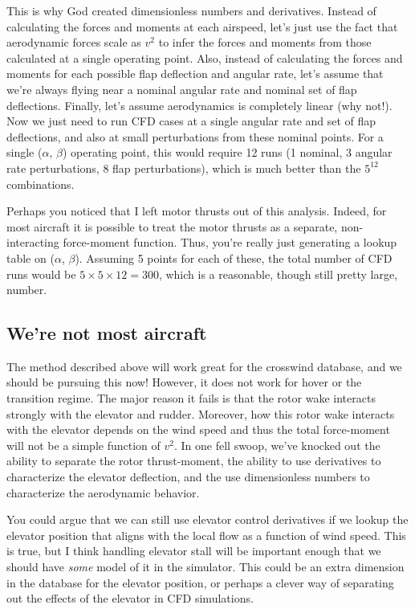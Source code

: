\documentclass[11pt]{amsart}
\begin{document}
This is why God created dimensionless numbers and derivatives. Instead
of calculating the forces and moments at each airspeed, let's just use
the fact that aerodynamic forces scale as $v^2$ to infer the forces
and moments from those calculated at a single operating point.  Also,
instead of calculating the forces and moments for each possible flap
deflection and angular rate, let's assume that we're always flying
near a nominal angular rate and nominal set of flap deflections.
Finally, let's assume aerodynamics is completely linear (why not!).
Now we just need to run CFD cases at a single angular rate and set of
flap deflections, and also at small perturbations from these nominal
points.  For a single ($\alpha$, $\beta$) operating point, this would
require 12 runs (1 nominal, 3 angular rate perturbations, 8 flap
perturbations), which is much better than the $5^{12}$ combinations.

Perhaps you noticed that I left motor thrusts out of this analysis.
Indeed, for most aircraft it is possible to treat the motor thrusts as
a separate, non-interacting force-moment function.  Thus, you're
really just generating a lookup table on ($\alpha$, $\beta$).
Assuming 5 points for each of these, the total number of CFD runs
would be $5 \times 5 \times 12 = 300$, which is a reasonable, though
still pretty large, number.

\subsection{We're not most aircraft}

The method described above will work great for the crosswind database,
and we should be pursuing this now!  However, it does not work for
hover or the transition regime.  The major reason it fails is that the
rotor wake interacts strongly with the elevator and rudder.  Moreover,
how this rotor wake interacts with the elevator depends on the wind
speed and thus the total force-moment will not be a simple function of
$v^2$.  In one fell swoop, we've knocked out the ability to separate
the rotor thrust-moment, the ability to use derivatives to
characterize the elevator deflection, and the use dimensionless
numbers to characterize the aerodynamic behavior.

You could argue that we can still use elevator control derivatives if
we lookup the elevator position that aligns with the local flow as a
function of wind speed.  This is true, but I think handling elevator
stall will be important enough that we should have {\it some} model of
it in the simulator.  This could be an extra dimension in the database
for the elevator position, or perhaps a clever way of separating out
the effects of the elevator in CFD simulations.
\end{document}
